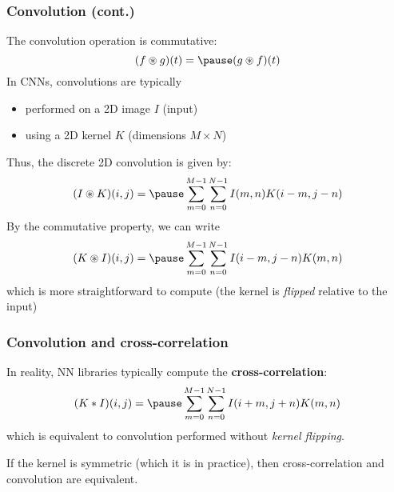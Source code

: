 \documentclass[smaller]{beamer}
\begin{document}
\begin{frame}
  \frametitle{Convolution (cont.)}
  \pause
  The convolution operation is commutative: \pause
  \begin{equation}
    (f\circledast g)(t) = \pause (g\circledast f)(t)
  \end{equation}
  \pause
    In CNNs, convolutions are typically
    \pause
    \begin{itemize}
    \item performed on a 2D image $I$ (input) \pause
    \item using a 2D kernel $K$ (dimensions $M\times N$)\pause
    \end{itemize}
    Thus, the discrete 2D convolution is given by: \pause
    \begin{equation}
      (I\circledast K)(i,j) = \pause\sum_{m=0}^{M-1}\sum_{n=0}^{N-1}I(m,n)K(i-m,j-n)
    \end{equation}
    \pause
    By the commutative property, we can write \pause
    \begin{equation}
      (K\circledast I)(i,j) = \pause\sum_{m=0}^{M-1}\sum_{n=0}^{N-1}I(i-m,j-n)K(m,n)
    \end{equation} \pause
    which is more straightforward to compute (the kernel is \textit{flipped} relative to the input)
  
\end{frame}



\begin{frame}
  \frametitle{Convolution and cross-correlation}
  In reality, NN libraries typically compute the \textbf{cross-correlation}:
  \pause
  \begin{equation}
    (K*I)(i,j) = \pause\sum_{m=0}^{M-1}\sum_{n=0}^{N-1}I(i+m, j+n)K(m,n)
  \end{equation}
  \pause
  which is equivalent to convolution performed without \textit{kernel flipping}.
  \pause
    \pause

    If the kernel is symmetric (which it is in practice), then cross-correlation and convolution are equivalent.
\end{frame}
\end{document}

